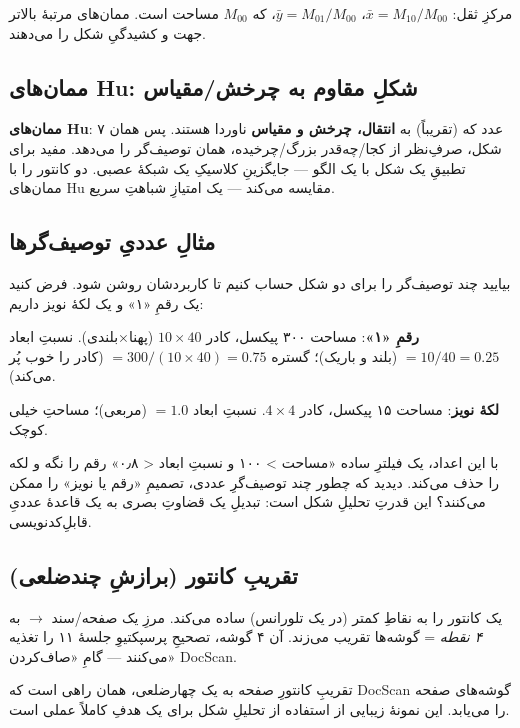 \documentclass[12pt,a4paper]{article}
\begin{document}
\begin{riyazi}
مرکزِ ثقل: $\bar{x}=M_{10}/M_{00}$، $\bar{y}=M_{01}/M_{00}$، که $M_{00}$ مساحت است. ممان‌های
مرتبهٔ بالاتر جهت و کشیدگیِ شکل را می‌دهند.
\end{riyazi}

\subsection{ممان‌های Hu: شکلِ مقاوم به چرخش/مقیاس}

\textbf{ممان‌های Hu}: ۷ عدد که (تقریباً) به \textbf{انتقال، چرخش و مقیاس} ناوردا هستند. پس همان
شکل، صرفِ‌نظر از کجا/چه‌قدر بزرگ/چرخیده، همان توصیف‌گر را می‌دهد. مفید برای تطبیقِ یک شکل با یک
الگو — جایگزینِ کلاسیکِ یک شبکهٔ عصبی.  دو کانتور را با ممان‌های Hu مقایسه
می‌کند — یک امتیازِ شباهتِ سریع.

\subsection{مثالِ عددیِ توصیف‌گرها}

بیایید چند توصیف‌گر را برای دو شکل حساب کنیم تا کاربردشان روشن شود. فرض کنید یک رقمِ «۱» و یک لکهٔ
نویز داریم:

\textbf{رقمِ «۱»}: مساحت ۳۰۰ پیکسل، کادر $10 \times 40$ (پهنا×بلندی). نسبتِ ابعاد $= 10/40 = 0.25$
(بلند و باریک)؛ گستره $= 300/(10 \times 40) = 0.75$ (کادر را خوب پُر می‌کند).

\textbf{لکهٔ نویز}: مساحت ۱۵ پیکسل، کادر $4 \times 4$. نسبتِ ابعاد $= 1.0$ (مربعی)؛ مساحتِ خیلی کوچک.

با این اعداد، یک فیلترِ ساده «مساحت > ۱۰۰ و نسبتِ ابعاد < ۰٫۸» رقم را نگه و لکه را حذف می‌کند.
دیدید که چطور چند توصیف‌گرِ عددی، تصمیمِ «رقم یا نویز» را ممکن می‌کنند؟ این قدرتِ تحلیلِ شکل است:
تبدیلِ یک قضاوتِ بصری به یک قاعدهٔ عددیِ قابلِ‌کدنویسی.

\subsection{تقریبِ کانتور (برازشِ چندضلعی)}

 یک کانتور را به نقاطِ کمتر (در یک تلورانس) ساده می‌کند. مرزِ یک صفحه/سند
$\rightarrow$ به \emph{۴ نقطه} = گوشه‌ها تقریب می‌زند. آن ۴ گوشه، تصحیحِ پرسپکتیوِ جلسهٔ ۱۱ را
تغذیه می‌کنند — گامِ «صاف‌کردن»ِ DocScan.

\begin{nokte}
تقریبِ کانتورِ صفحه به یک چهارضلعی، همان راهی است که DocScan گوشه‌های صفحه را می‌یابد. این نمونهٔ
زیبایی از استفاده از تحلیلِ شکل برای یک هدفِ کاملاً عملی است.
\end{nokte}
\end{document}
